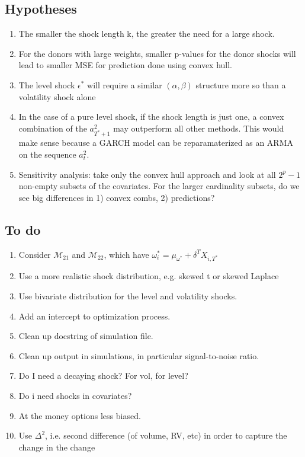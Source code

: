 \documentclass[11pt]{article}
\def\mc#1{\mathcal{#1}} %
\def\mc#1{\mathcal{#1}}
\theoremstyle{definition}
\begin{document}
\subsection{Hypotheses}
\begin{enumerate}
\item The smaller the shock length k, the greater the need for a large shock.  
\item For the donors with large weights, smaller p-values for the donor shocks will lead to smaller MSE for prediction done using convex hull.
\item The level shock $\epsilon^{*}$ will require a similar $(\alpha, \beta)$ structure more so than a volatility shock alone
\item In the case of a pure level shock, if the shock length is just one, a convex combination of the $a^{2}_{T^{*}+1}$ may outperform all other methods.  This would make sense because a GARCH model can be reparamaterized as an ARMA on the sequence $a^{2}_{t}$.
\item Sensitivity analysis: take only the convex hull approach and look at all $2^{p }- 1$ non-empty subsets of the covariates. For the larger cardinality subsets, do we see big differences in 1) convex combs, 2) predictions?
\end{enumerate}

\subsection{To do}
\begin{enumerate}
\item Consider $\mc{M}_{21}$ and $\mc{M}_{22}$, which have $\omega^{*}_{i} = \mu_{\omega^{*}} + \delta^{T}X_{i, T^{*}}$
\item Use a more realistic shock distribution, e.g. skewed t or skewed Laplace
\item Use bivariate distribution for the level and volatility shocks.
\item Add an intercept to optimization process.
\item Clean up docstring of simulation file.
\item Clean up output in simulations, in particular signal-to-noise ratio.
\item Do I need a decaying shock?  For vol, for level?
\item Do i need shocks in covariates? 
\item At the money options less biased.
\item Use $\Delta^{2}$, i.e. second difference (of volume, RV, etc) in order to capture the change in the change
\end{enumerate}
\end{document}

